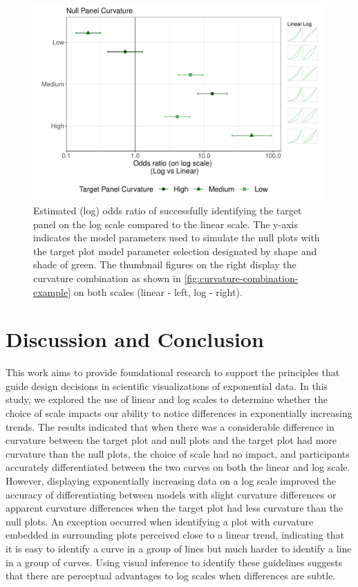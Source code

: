 \documentclass[12pt]{article}
\begin{document}
\begin{figure}[tbp]

{\centering \includegraphics[width=\linewidth,]{logarithmic-lineups-revisions_files/figure-latex/odds-ratio-plot-1} 

}

\caption[Lineups log(odds) results]{Estimated (log) odds ratio of successfully identifying the target panel on the log scale compared to the linear scale. The y-axis indicates the model parameters used to simulate the null plots with the target plot model parameter selection designated by shape and shade of green. The thumbnail figures on the right display the curvature combination as shown in \cref{fig:curvature-combination-example} on both scales (linear - left, log - right).}\label{fig:odds-ratio-plot}
\end{figure}

\hypertarget{discussion-conclusion}{%
\section{Discussion and Conclusion}\label{discussion-conclusion}}

This work aims to provide foundational research to support the
principles that guide design decisions in scientific visualizations of
exponential data. In this study, we explored the use of linear and log
scales to determine whether the choice of scale impacts our ability to
notice differences in exponentially increasing trends. The results
indicated that when there was a considerable difference in curvature
between the target plot and null plots and the target plot had more
curvature than the null plots, the choice of scale had no impact, and
participants accurately differentiated between the two curves on both
the linear and log scale. However, displaying exponentially increasing
data on a log scale improved the accuracy of differentiating between
models with slight curvature differences or apparent curvature
differences when the target plot had less curvature than the null plots.
An exception occurred when identifying a plot with curvature embedded in
surrounding plots perceived close to a linear trend, indicating that it
is easy to identify a curve in a group of lines but much harder to
identify a line in a group of curves. Using visual inference to identify
these guidelines suggests that there are perceptual advantages to log
scales when differences are subtle.
\end{document}
